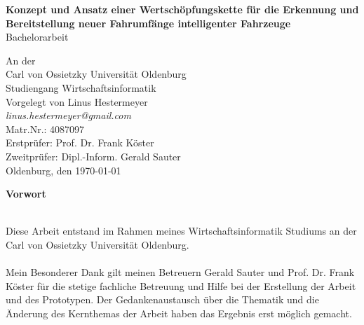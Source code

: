 \documentclass{article}
\begin{document}
\begin{titlepage}
	\begin{figure}[H]
		\centering
	\end{figure}
	
	\begin{center}
		\large{\textbf{Konzept und Ansatz einer Wertschöpfungskette für die Erkennung und Bereitstellung neuer Fahrumfänge intelligenter Fahrzeuge}}\\
		\large Bachelorarbeit
	\end{center}
	\vfill
	\begin{center}
		\large{
			An der\\
			Carl von Ossietzky Universität Oldenburg\\
			Studiengang Wirtschaftsinformatik\\
			
			\vspace{1cm}
			Vorgelegt von Linus Hestermeyer\\ 
			\textit{linus.hestermeyer@gmail.com}\\
			Matr.Nr.: 4087097\\
			\vfill
			Erstprüfer: Prof. Dr. Frank Köster\\
			Zweitprüfer: Dipl.-Inform. Gerald Sauter\\
			\vfill
			\noindent
			Oldenburg, den \today
		}
	\end{center}
\end{titlepage}
\clearpage
\newpage
\thispagestyle{empty}
\null
\newpage
\thispagestyle{empty}
\null
\begin{huge}
	\textbf{Vorwort}\\\\
\end{huge}
Diese Arbeit entstand im Rahmen meines Wirtschaftsinformatik Studiums an der Carl von Ossietzky Universität Oldenburg.\\\\
Mein Besonderer Dank gilt meinen Betreuern Gerald Sauter und Prof. Dr. Frank Köster für die stetige fachliche Betreuung und Hilfe bei der Erstellung der Arbeit und des Prototypen. Der Gedankenaustausch über die Thematik und die Änderung des Kernthemas der Arbeit haben das Ergebnis erst möglich gemacht.\\\\
\end{document}
